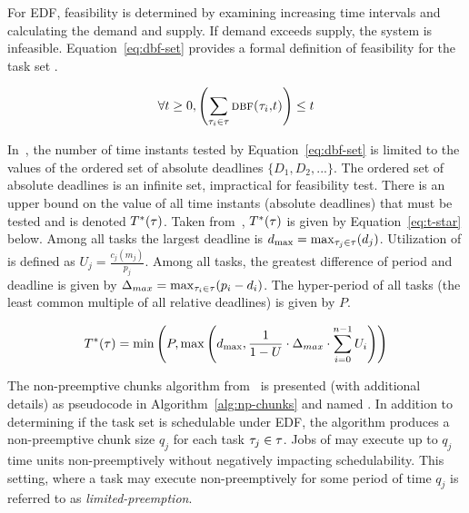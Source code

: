 \documentclass[a4paper,UKenglish,cleveref,autoref,english]{lipics-v2019}
\begin{document}
For EDF, feasibility is determined by examining increasing time
intervals and calculating the demand and supply. If demand exceeds
supply, the system is infeasible. Equation~\ref{eq:dbf-set} provides a
formal definition of feasibility for the task set \tasks{}.

\begin{definition}
  \begin{equation}
    \label{eq:dbf-set}
      \forall t \ge 0, 
      \left(
        \sum_{\tau_{i} \in \tau{}} \text{\sc{dbf}(\ensuremath{\tau_{i}},$t$)}
      \right)
      \le t
  \end{equation}
\end{definition}

In~\cite{Baruah:2005}, the number of time instants tested by
Equation~\ref{eq:dbf-set} is limited to the values of the ordered set
of absolute deadlines ${\{D_1, D_2, ... \}}$. The ordered set of
absolute deadlines is an infinite set, impractical for feasibility
test. There is an upper bound on the value of all time instants
(absolute deadlines) that must be tested and is denoted
${T^*(\tau{})}$. Taken from~\cite{George:1996}, ${T^*(\tau{})}$ is given by
Equation~\ref{eq:t-star} below. Among all tasks the largest deadline
is ${d_{\text{max}} = \max_{\tau_{j} \in \tau}(d_j)}$. Utilization of  is defined as ${U_j =
  \frac{c_j(m_j)}{p_j}}$. Among all tasks, the greatest difference of
period and deadline is given by ${\Delta_{max} = \max_{\tau_i \in \tau}(p_i -
  d_i )}$.  The hyper-period of all tasks (the least common multiple
of all relative deadlines) is given by ${P}$.

\begin{definition} 
  \begin{equation}\label{eq:t-star}
    T^*(\tau{}) = \min \left(P,
    \max \left(
    d_{\text{max}}, \frac{1}{1 - U}
    \cdot \Delta_{max} \cdot
    \sum_{i=0}^{n-1} U_i
    \right)
    \right)
  \end{equation}
\end{definition}

The non-preemptive chunks algorithm from~\cite{Baruah:2005} is
presented (with additional details) as pseudocode in
Algorithm~\ref{alg:np-chunks} and named \npchunks{}. In addition to
determining if the task set is schedulable under EDF, the algorithm
produces a non-preemptive chunk size ${q_j}$ for each task ${\tau_{j}
  \in \tau}$. Jobs of  may execute up to ${q_j}$ time units
non-preemptively without negatively impacting schedulability. This
setting, where a task  may execute non-preemptively for some
period of time ${q_j}$ is referred to as \emph{limited-preemption}. 
\end{document}
